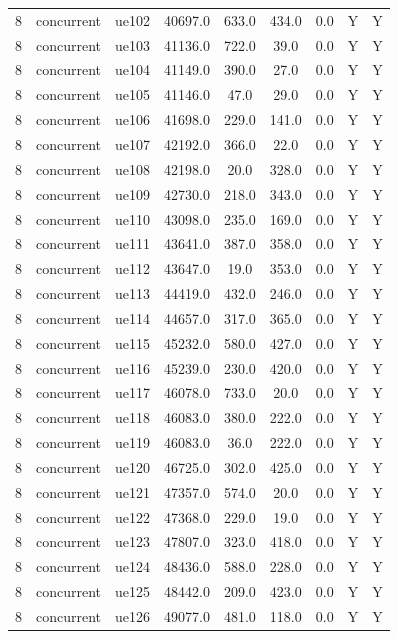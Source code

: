 \begin{table}[ht]
\begin{tabular}{|c|c|c|c|c|c|c|c|c|}
8 & concurrent & ue102 & 40697.0 & 633.0 & 434.0 & 0.0 & Y & Y \\
8 & concurrent & ue103 & 41136.0 & 722.0 & 39.0 & 0.0 & Y & Y \\
8 & concurrent & ue104 & 41149.0 & 390.0 & 27.0 & 0.0 & Y & Y \\
8 & concurrent & ue105 & 41146.0 & 47.0 & 29.0 & 0.0 & Y & Y \\
8 & concurrent & ue106 & 41698.0 & 229.0 & 141.0 & 0.0 & Y & Y \\
8 & concurrent & ue107 & 42192.0 & 366.0 & 22.0 & 0.0 & Y & Y \\
8 & concurrent & ue108 & 42198.0 & 20.0 & 328.0 & 0.0 & Y & Y \\
8 & concurrent & ue109 & 42730.0 & 218.0 & 343.0 & 0.0 & Y & Y \\
8 & concurrent & ue110 & 43098.0 & 235.0 & 169.0 & 0.0 & Y & Y \\
8 & concurrent & ue111 & 43641.0 & 387.0 & 358.0 & 0.0 & Y & Y \\
8 & concurrent & ue112 & 43647.0 & 19.0 & 353.0 & 0.0 & Y & Y \\
8 & concurrent & ue113 & 44419.0 & 432.0 & 246.0 & 0.0 & Y & Y \\
8 & concurrent & ue114 & 44657.0 & 317.0 & 365.0 & 0.0 & Y & Y \\
8 & concurrent & ue115 & 45232.0 & 580.0 & 427.0 & 0.0 & Y & Y \\
8 & concurrent & ue116 & 45239.0 & 230.0 & 420.0 & 0.0 & Y & Y \\
8 & concurrent & ue117 & 46078.0 & 733.0 & 20.0 & 0.0 & Y & Y \\
8 & concurrent & ue118 & 46083.0 & 380.0 & 222.0 & 0.0 & Y & Y \\
8 & concurrent & ue119 & 46083.0 & 36.0 & 222.0 & 0.0 & Y & Y \\
8 & concurrent & ue120 & 46725.0 & 302.0 & 425.0 & 0.0 & Y & Y \\
8 & concurrent & ue121 & 47357.0 & 574.0 & 20.0 & 0.0 & Y & Y \\
8 & concurrent & ue122 & 47368.0 & 229.0 & 19.0 & 0.0 & Y & Y \\
8 & concurrent & ue123 & 47807.0 & 323.0 & 418.0 & 0.0 & Y & Y \\
8 & concurrent & ue124 & 48436.0 & 588.0 & 228.0 & 0.0 & Y & Y \\
8 & concurrent & ue125 & 48442.0 & 209.0 & 423.0 & 0.0 & Y & Y \\
8 & concurrent & ue126 & 49077.0 & 481.0 & 118.0 & 0.0 & Y & Y \\

\end{tabular}
\end{table}
